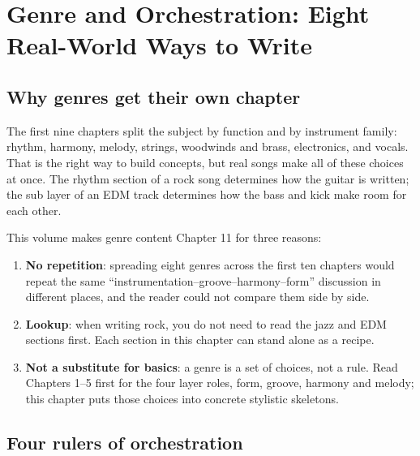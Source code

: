 \chapter{Genre and Orchestration: Eight Real-World Ways to Write}
\label{ch:genres}


\section{Why genres get their own chapter}
\label{sec:genres-why}

The first nine chapters split the subject by function and by instrument family: rhythm, harmony, melody, strings, woodwinds and brass, electronics, and vocals. That is the right way to build concepts, but real songs make all of these choices at once. The rhythm section of a rock song determines how the guitar is written; the sub layer of an EDM track determines how the bass and kick make room for each other.

This volume makes genre content Chapter 11 for three reasons:

\begin{enumerate}
\item \textbf{No repetition}: spreading eight genres across the first ten chapters would repeat the same ``instrumentation--groove--harmony--form'' discussion in different places, and the reader could not compare them side by side.
\item \textbf{Lookup}: when writing rock, you do not need to read the jazz and EDM sections first. Each section in this chapter can stand alone as a recipe.
\item \textbf{Not a substitute for basics}: a genre is a set of choices, not a rule. Read Chapters 1--5 first for the four layer roles, form, groove, harmony and melody; this chapter puts those choices into concrete stylistic skeletons.
\end{enumerate}

\section{Four rulers of orchestration}
\label{sec:orchestration-rulers}

